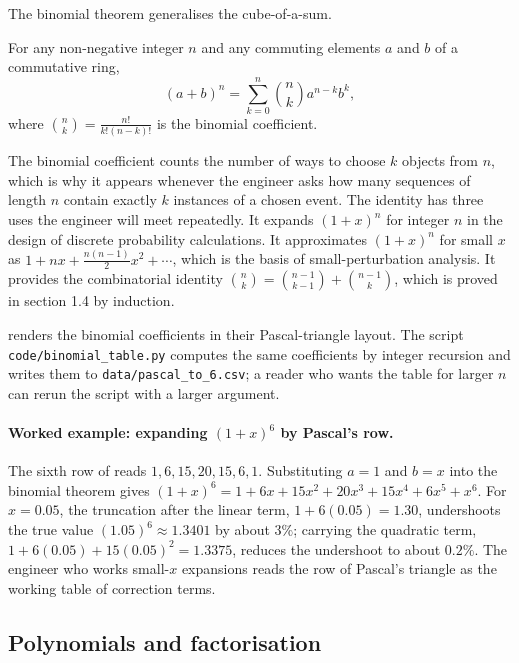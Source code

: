 The binomial theorem generalises the cube-of-a-sum.

\begin{principle}
For any non-negative integer $n$ and any commuting elements $a$ and
$b$ of a commutative ring,
\[
(a + b)^{n} = \sum_{k=0}^{n} \binom{n}{k} a^{n-k} b^{k},
\]
where $\binom{n}{k} = \frac{n!}{k!(n-k)!}$ is the binomial
coefficient.
\end{principle}

The binomial coefficient counts the number of ways to choose $k$
objects from $n$, which is why it appears whenever the engineer asks
how many sequences of length $n$ contain exactly $k$ instances of a
chosen event. The identity has three uses the engineer will meet
repeatedly. It expands $(1+x)^{n}$ for integer $n$ in the design of
discrete probability calculations. It approximates $(1+x)^{n}$ for
small $x$ as $1 + nx + \tfrac{n(n-1)}{2}x^{2} + \cdots$, which is the
basis of small-perturbation analysis. It provides the combinatorial
identity $\binom{n}{k} = \binom{n-1}{k-1} + \binom{n-1}{k}$, which is
proved in section 1.4 by induction.



 renders the binomial
coefficients in their Pascal-triangle layout. The script
\texttt{code/binomial\_table.py} computes the same coefficients by
integer recursion and writes them to
\texttt{data/pascal\_to\_6.csv}; a reader who wants the table for
larger $n$ can rerun the script with a larger argument.

\paragraph{Worked example: expanding $(1 + x)^{6}$ by Pascal's row.}
The sixth row of  reads $1, 6,
15, 20, 15, 6, 1$. Substituting $a = 1$ and $b = x$ into the
binomial theorem gives $(1 + x)^{6} = 1 + 6x + 15 x^{2} + 20 x^{3} +
15 x^{4} + 6 x^{5} + x^{6}$. For $x = 0.05$, the truncation after
the linear term, $1 + 6(0.05) = 1.30$, undershoots the true value
$(1.05)^{6} \approx 1.3401$ by about $3\%$; carrying the quadratic
term, $1 + 6(0.05) + 15(0.05)^{2} = 1.3375$, reduces the
undershoot to about $0.2\%$. The engineer who works small-$x$
expansions reads the row of Pascal's triangle as the working table
of correction terms.

\subsection{Polynomials and factorisation}

